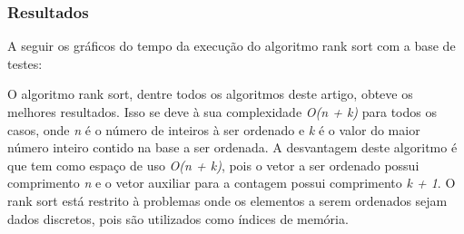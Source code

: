 \documentclass[fleqn,10pt]{SelfArx} %
\begin{document}
\subsubsection*{Resultados}

A seguir os gráficos do tempo da execução do algoritmo rank sort com a base de testes:\newline

{\setlength{\parindent}{-0.5em}
}\newline

{\setlength{\parindent}{-0.5em}
}\newline

{\setlength{\parindent}{-0.5em}
}\newline

O algoritmo rank sort, dentre todos os algoritmos deste artigo, obteve os melhores resultados. Isso se deve à sua 
complexidade \emph{O(n + k)} para todos os casos, onde \emph{n} é o número de inteiros à ser ordenado e \emph{k} é 
o valor do maior número inteiro contido na base a ser ordenada. A desvantagem deste algoritmo é que tem como 
espaço de uso \emph{O(n + k)}, pois o vetor a ser ordenado possui comprimento \emph{n} e o vetor auxiliar para 
a contagem possui comprimento \emph{k + 1}. O rank sort está restrito à problemas onde os elementos a serem 
ordenados sejam dados discretos, pois são utilizados como índices de memória.
\end{document}
